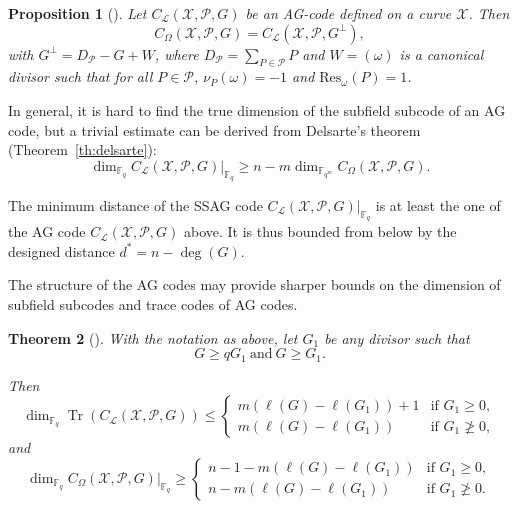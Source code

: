 \documentclass[a4paper]{amsart}
\newtheorem{thm}{Theorem}[section]
\newtheorem{proposition}[thm]{Proposition}
\theoremstyle{definition}
\theoremstyle{remark}
\newcommand{\calP}{\mathcal{P}}
\newcommand{\calL}{\mathcal{L}}
\newcommand{\calX}{\mathcal{X}}
\newcommand{\fqm}{\mathbb{F}_{q^m}}
\newcommand{\fq}{\mathbb{F}_{q}}
\newcommand{\Tr}[1]{\operatorname{Tr}\left(#1\right)}
\newcommand{\ssag}[1]{\operatorname{\mathsf{SSAG}}_{q}\left(#1\right)}
\begin{document}
\begin{proposition} [{\cite[Proposition~2.2.10]{Sti09}}] \label{prop:dual_AG_codes}
Let $C_{\calL}(\calX,\calP,G)$ be an AG-code defined on a curve $\calX$. Then 
\[C_{\Omega}(\calX,\calP,G) = C_{\calL}(\calX,\calP,G^{\perp}),\]
with $G^{\perp} = D_{\calP}-G+W$, where $D_{\calP} = \sum\limits_{P \in \calP} P$ and $W=(\omega)$ is a canonical divisor such that for all $P \in \calP$, $\nu_P(\omega)=-1$ and $\mathrm{Res}_{\omega}(P)=1$. 
\end{proposition}


In general, it is hard to find the true dimension of the subfield subcode of an AG code, but a trivial estimate can be derived from Delsarte's theorem (Theorem~\ref{th:delsarte}):
\begin{equation}\label{eq:dim_ssag}
	\dim_{\fq} C_{\calL}(\calX,\calP,G)|_{\fq} \geq n - m\dim_{\fqm} C_{\Omega}(\calX,\calP,G).
\end{equation}

The minimum distance of the SSAG code $C_{\calL}(\calX,\calP,G)|_{\fq}$ is at least the one of the AG code $C_{\calL}(\calX,\calP,G)$ above. It is thus bounded from below by the designed distance $d^*=n-\deg (G)$.%

The structure of the AG codes may provide sharper bounds on the dimension of subfield subcodes and trace codes of AG codes.

\begin{thm}[{\cite[Theorem~9.1.6]{Sti09}}]\label{thm:dim_ssag}
	With the notation as above, let $G_1$ be any divisor such that 
	\begin{equation} \label{eq:divisor_G_1}
		G \geq qG_1 \ \mathrm{and} \ G \geq G_1.
	\end{equation}

	Then
\[	\dim_{\fq} \Tr{C_{\calL}(\calX,\calP,G)} \leq  \left\{\begin{array}{ll}
	m\left(\ell(G) - \ell(G_1)\right)+1 & \text{if } G_1 \geq 0, \\
	m\left(\ell(G) - \ell(G_1)\right) & \text{if } G_1 \not\geq 0, 
\end{array} \right.\]	
	and	
\[	\dim_{\fq} C_{\Omega}(\calX,\calP,G)|_{\fq} \geq  \left\{\begin{array}{ll}
	n-1-m\left(\ell(G) - \ell(G_1)\right) & \text{if } G_1 \geq 0, \\
	n-m\left(\ell(G) - \ell(G_1)\right) & \text{if } G_1 \not\geq 0. 
\end{array} \right.\]
\end{thm}
\end{document}

